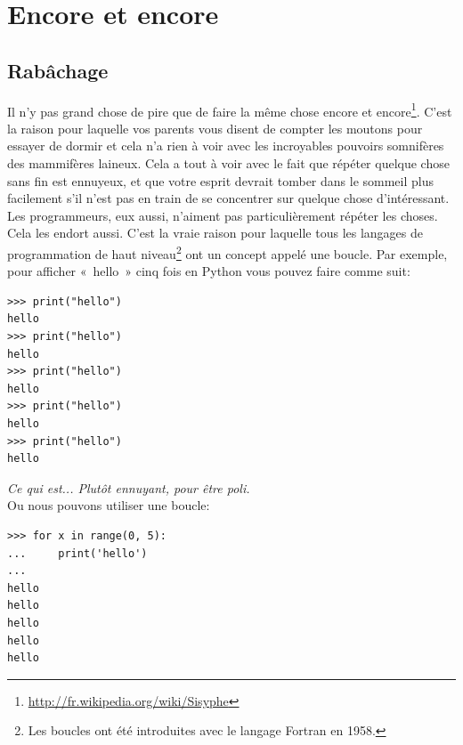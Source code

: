 



\chapter{Encore et encore}\label{ch:againandagain}
\section{Rabâchage}
Il n'y pas grand chose de pire que de faire la même chose encore et encore\footnote{\url{http://fr.wikipedia.org/wiki/Sisyphe}}.
C'est la raison pour laquelle vos parents vous disent de compter les moutons pour essayer de dormir et cela n'a rien à voir avec les incroyables pouvoirs somnifères des mammifères laineux. Cela  a tout à voir avec le fait que répéter quelque chose sans fin est ennuyeux, et que votre esprit devrait tomber dans le sommeil plus facilement s'il n'est pas en train de se concentrer sur quelque chose d'intéressant.\\


Les programmeurs, eux aussi, n'aiment pas particulièrement répéter les choses. Cela les endort aussi. C'est la vraie raison pour laquelle tous les langages de programmation de haut niveau\footnote{Les boucles ont été introduites avec le langage Fortran en 1958.} ont un concept appelé une boucle. Par exemple, pour afficher « hello »  cinq fois en Python vous pouvez faire comme suit:

\begin{Verbatim}[frame=single,rulecolor=\color{gray}, label=ne pas saisir]
>>> print("hello")
hello
>>> print("hello")
hello
>>> print("hello")
hello
>>> print("hello")
hello
>>> print("hello")
hello
\end{Verbatim}

\emph{Ce qui est... Plutôt ennuyant, pour être poli.}\\


Ou nous pouvons utiliser une boucle:

\begin{Verbatim}[frame=single,rulecolor=\color{green}, label=à taper avec attention]
>>> for x in range(0, 5):
...     print('hello')
...
hello
hello
hello
hello
hello
\end{Verbatim}


